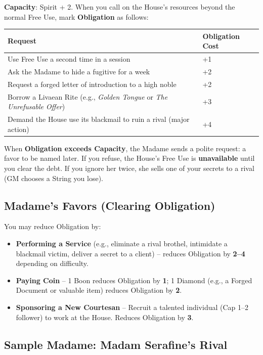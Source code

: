 \documentclass[10pt,twoside]{book}
\begin{document}
\textbf{Capacity}: Spirit + 2.  
When you call on the House's resources beyond the normal Free Use, mark \textbf{Obligation} as follows:

\begin{center}
\begin{tabular}{ll}
\toprule
\textbf{Request} & \textbf{Obligation Cost} \\
\midrule
Use Free Use a second time in a session & +1 \\
Ask the Madame to hide a fugitive for a week & +2 \\
Request a forged letter of introduction to a high noble & +2 \\
Borrow a Livaean Rite (e.g., \textit{Golden Tongue} or \textit{The Unrefusable Offer}) & +3 \\
Demand the House use its blackmail to ruin a rival (major action) & +4 \\
\bottomrule
\end{tabular}
\end{center}

When \textbf{Obligation exceeds Capacity}, the Madame sends a polite request: a favor to be named later. If you refuse, the House's Free Use is \textbf{unavailable} until you clear the debt. If you ignore her twice, she sells one of your secrets to a rival (GM chooses a String you lose).

\subsection{Madame's Favors (Clearing Obligation)}

You may reduce Obligation by:

\begin{itemize}
  \item \textbf{Performing a Service} (e.g., eliminate a rival brothel, intimidate a blackmail victim, deliver a secret to a client) -- reduces Obligation by \textbf{2--4} depending on difficulty.
  \item \textbf{Paying Coin} -- 1 Boon reduces Obligation by \textbf{1}; 1 Diamond (e.g., a Forged Document or valuable item) reduces Obligation by \textbf{2}.
  \item \textbf{Sponsoring a New Courtesan} -- Recruit a talented individual (Cap 1--2 follower) to work at the House. Reduces Obligation by \textbf{3}.
\end{itemize}

\subsection{Sample Madame: Madam Serafine's Rival}
\end{document}
